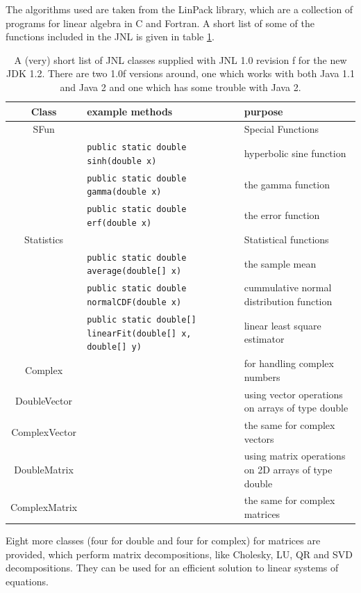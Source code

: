 The algorithms used are taken from the LinPack library, which
are a collection of programs for linear algebra in C and Fortran.
A short list of some of the functions included in the JNL is
given in table \ref{tab:JNL}.
\begin{table}
    \begin{tabular}{>{\large}c||>{\scriptsize}l|l}
      \textbf{Class}  & \normalsize\textbf{example methods} & \textbf{purpose} \\\hline\hline
      SFun &  & Special Functions \\
           & \verb|public static double sinh(double x)| & hyperbolic sine function \\
           & \verb|public static double gamma(double x)| & the gamma function \\
           & \verb|public static double erf(double x)| & the error function \\\hline
      Statistics &  & Statistical functions \\
           & \verb|public static double average(double[] x)| & the sample mean\\
           & \verb|public static double normalCDF(double x)| & 
                             cummulative normal distribution function\\
           & \verb|public static double[] linearFit(double[] x, double[] y)| &
                             linear least square estimator \\\hline
      Complex &  & for handling complex numbers \\\hline
      DoubleVector &  & using vector operations on arrays of type double\\
      ComplexVector & & the same for complex vectors \\\hline 
      DoubleMatrix &  & using matrix operations on 2D arrays of type double\\
      ComplexMatrix & & the same for complex matrices \\\hline 
    \end{tabular}
    \caption{A (very) short list of JNL classes supplied with JNL 1.0 revision f for the new JDK 1.2. There are two 1.0f versions around, one which works with both Java 1.1 and Java 2 and one which has some trouble with Java 2.}
    \label{tab:JNL}
\end{table}
Eight more classes (four for double and four for complex) for
matrices are provided, which perform matrix decompositions,
like Cholesky, LU, QR and SVD decompositions. They can be
used for an efficient solution to linear systems of equations.
 
